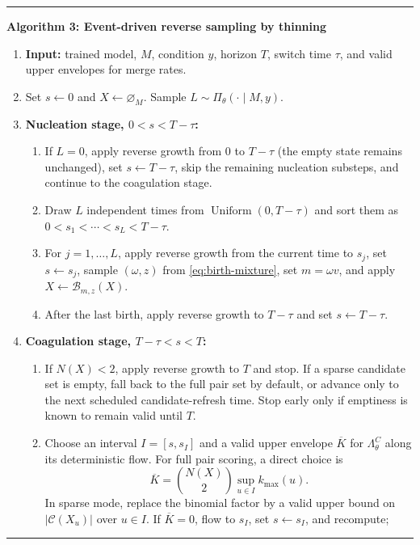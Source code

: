 \documentclass[10pt]{article}
\theoremstyle{definition}
\theoremstyle{remark}
\newcommand{\emptyconfig}{\varnothing_M}
\newcommand{\birthmap}{\mathcal{B}}
\newenvironment{algorithmblock}[1]
{\par\medskip\noindent\begin{minipage}{\linewidth}\hrule\medskip
 \noindent\textbf{#1}\par\smallskip\small}
{\par\medskip\hrule\end{minipage}\par\medskip}
\begin{document}
\begin{algorithmblock}{Algorithm 3: Event-driven reverse sampling by thinning}
\begin{enumerate}
  \item \textbf{Input:} trained model, $M$, condition $y$, horizon $T$,
  switch time $\tau$, and valid upper envelopes for merge rates.
  \item Set $s\leftarrow0$ and $X\leftarrow\emptyconfig$.
  Sample $L\sim\Pi_\theta(\cdot\mid M,y)$.
  \item \textbf{Nucleation stage, $0<s<T-\tau$:}
  \begin{enumerate}
    \item If $L=0$, apply reverse growth from $0$ to $T-\tau$ (the empty
    state remains unchanged), set $s\leftarrow T-\tau$, skip the remaining
    nucleation substeps, and continue to the coagulation stage.
    \item Draw $L$ independent times from
    $\operatorname{Uniform}(0,T-\tau)$ and sort them as
    $0<s_1<\cdots<s_L<T-\tau$.
    \item For $j=1,\ldots,L$, apply reverse growth from the current time to
    $s_j$, set $s\leftarrow s_j$, sample $(\omega,z)$ from
    \eqref{eq:birth-mixture}, set $m=\omega v$, and apply
    $X\leftarrow\birthmap_{m,z}(X)$.
    \item After the last birth, apply reverse growth to $T-\tau$ and set
    $s\leftarrow T-\tau$.
  \end{enumerate}
  \item \textbf{Coagulation stage, $T-\tau<s<T$:}
  \begin{enumerate}
    \item If $N(X)<2$, apply reverse growth to $T$ and stop.  If a sparse
    candidate set is empty, fall back to the full pair set by default, or
    advance only to the next scheduled candidate-refresh time.  Stop early
    only if emptiness is known to remain valid until $T$.
    \item Choose an interval $I=[s,s_I]$ and a valid upper envelope
    $\overline K$ for $\Lambda_\theta^C$ along its deterministic flow.  For
    full pair scoring, a direct choice is
    \begin{equation*}
      \overline K=\binom{N(X)}{2}\sup_{u\in I}k_{\max}(u).
    \end{equation*}
    In sparse mode, replace the binomial factor by a valid upper bound on
    $|\mathcal C(X_u)|$ over $u\in I$.
    If $\overline K=0$, flow to $s_I$, set $s\leftarrow s_I$, and recompute;

\end{enumerate}
\end{enumerate}
\end{algorithmblock}
\end{document}
